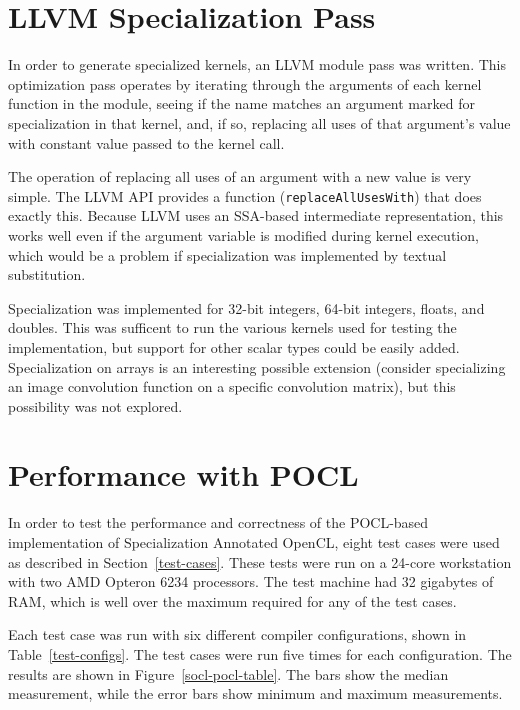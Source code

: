 \documentclass{acm_proc_article-sp}
\begin{document}
\section{LLVM Specialization Pass}

In order to generate specialized kernels, an LLVM module
pass\cite{LLVM:Doc:WritePass} was written. This optimization pass operates by
iterating through the arguments of each kernel function in the module, seeing
if the name matches an argument marked for specialization in that kernel, and,
if so, replacing all uses of that argument's value with constant value
passed to the kernel call. 

The operation of replacing all uses of an argument with a new value is very
simple. The LLVM API provides a function ({\tt replaceAllUsesWith}) that does
exactly this. Because LLVM uses an SSA-based intermediate representation, this
works well even if the argument variable is modified during kernel execution,
which would be a problem if specialization was implemented by textual
substitution.

Specialization was implemented for 32-bit integers, 64-bit integers, floats,
and doubles. This was sufficent to run the various kernels used for testing the
implementation, but support for other scalar types could be easily added.
Specialization on arrays is an interesting possible extension (consider
specializing an image convolution function on a specific convolution matrix),
but this possibility was not explored.

\section{Performance with POCL}



In order to test the performance and correctness of the POCL-based
implementation of Specialization Annotated OpenCL, eight test cases were used
as described in Section~\ref{test-cases}. These tests were run on a 24-core
workstation with two AMD Opteron 6234 processors. The test machine had 32
gigabytes of RAM, which is well over the maximum required for any of the test
cases.

Each test case was run with six different compiler configurations, shown in
Table~\ref{test-configs}. The test cases were run five times for each
configuration. The results are shown in Figure~\ref{socl-pocl-table}. The bars
show the median measurement, while the error bars show minimum and maximum
measurements.
\end{document}

